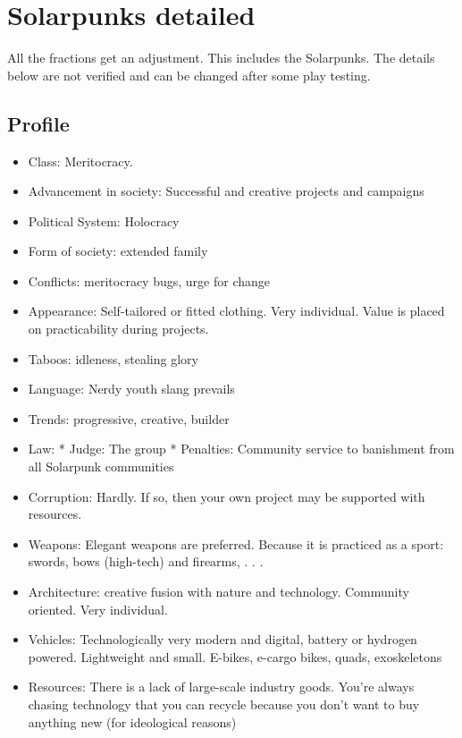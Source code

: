 \section {Solarpunks detailed}


\begin{warning}
    All the fractions get an adjustment. This includes the Solarpunks. The details below are not verified and can be changed after some play testing.

\end{warning}

\subsection{Profile}
\begin{itemize}
    \item Class: Meritocracy.
    \item Advancement in society: Successful and creative projects and campaigns
    \item Political System: Holocracy
    \item Form of society: extended family
    \item Conflicts: meritocracy bugs, urge for change
    \item Appearance: Self-tailored or fitted clothing. Very individual. Value is placed on practicability during projects.
    \item Taboos: idleness, stealing glory
    \item Language: Nerdy youth slang prevails
    \item Trends: progressive, creative, builder
    \item Law: * Judge: The group * Penalties: Community service to banishment from all Solarpunk communities
    \item Corruption: Hardly. If so, then your own project may be supported with resources.
    \item Weapons: Elegant weapons are preferred. Because it is practiced as a sport: swords, bows (high-tech) and firearms, . . .
    \item Architecture: creative fusion with nature and technology. Community oriented. Very individual.
    \item Vehicles: Technologically very modern and digital, battery or hydrogen powered. Lightweight and small. E-bikes, e-cargo bikes, quads, exoskeletons
    \item Resources: There is a lack of large-scale industry goods. You're always chasing technology that you can recycle because you don't want to buy anything new (for ideological reasons)

\end{itemize}
